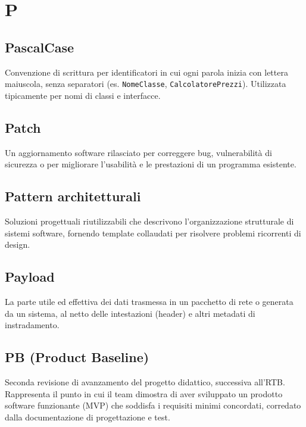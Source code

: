 \documentclass[a4paper, 11pt, oneside]{scrartcl} %
\begin{document}

\section*{P}


\subsection*{PascalCase}
Convenzione di scrittura per identificatori in cui ogni parola inizia con lettera maiuscola, senza separatori (es. \texttt{NomeClasse}, \texttt{CalcolatorePrezzi}). Utilizzata tipicamente per nomi di classi e interfacce.
\vspace{0.5cm}

\subsection*{Patch}
Un aggiornamento software rilasciato per correggere bug, vulnerabilità di sicurezza o per migliorare l'usabilità e le prestazioni di un programma esistente.
\vspace{0.5cm}

\subsection*{Pattern architetturali}


Soluzioni progettuali riutilizzabili che descrivono l'organizzazione strutturale di sistemi software, fornendo template collaudati per risolvere problemi ricorrenti di design.

\vspace{0.5cm}

\subsection*{Payload}
La parte utile ed effettiva dei dati trasmessa in un pacchetto di rete o generata da un sistema, al netto delle intestazioni (header) e altri metadati di instradamento.
\vspace{0.5cm}

\subsection*{PB (Product Baseline)}
Seconda revisione di avanzamento del progetto didattico, successiva all'RTB. Rappresenta il punto in cui il team dimostra di aver sviluppato un prodotto software funzionante (MVP) che soddisfa i requisiti minimi concordati, corredato dalla documentazione di progettazione e test.
\vspace{0.5cm}
\end{document}
